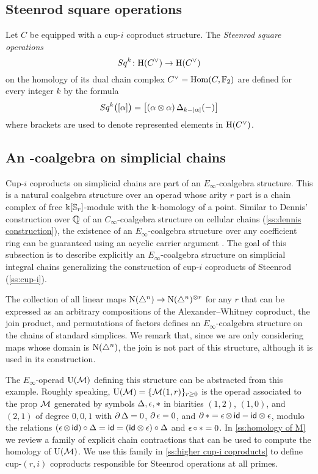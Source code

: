 \subsection{Steenrod square operations} \label{ss:steenrod squares}

Let $C$ be equipped with a cup-$i$ coproduct structure.
The \textit{Steenrod square operations}
\[
Sq^k \colon \mathrm{H}(C^\vee) \to \mathrm{H}(C^\vee)
\]
on the homology of its dual chain complex $C^\vee = \mathrm{Hom}(C, {\mathbb{F}_2})$ are defined for every integer $k$ by the formula
\begin{equation} \label{e:steenrod squares}
	Sq^k \big( [\alpha] \big) = \big[ (\alpha \otimes \alpha) \operatorname{\Delta}_{k - \lvert\alpha\rvert}(-) \big]
\end{equation}
where brackets are used to denote represented elements in $\mathrm{H}(C^\vee)$.


\subsection{An \pdfEinfty-coalgebra on simplicial chains} \label{ss:e-infty generalization}

Cup-$i$ coproducts on simplicial chains are part of an $E_\infty$-coalgebra structure.
This is a natural coalgebra structure over an operad whose arity $r$ part is a chain complex of free $\Bbbk[\mathbb{S}_r]$-module with the $\Bbbk$-homology of a point.
Similar to Dennis' construction over $\mathbb{Q}$ of an $C_\infty$-coalgebra structure on cellular chains (\cref{ss:dennis construction}), the existence of an $E_\infty$-coalgebra structure over any coefficient ring can be guaranteed using an acyclic carrier argument \cite{eilenberg1953acyclic}.
The goal of this subsection is to describe explicitly an $E_\infty$-coalgebra structure on simplicial integral chains generalizing the construction of cup-$i$ coproducts of Steenrod (\cref{ss:cup-i}).

The collection of all linear maps $\operatorname{N}(\triangle^n) \to \operatorname{N}(\triangle^n)^{\otimes r}$ for any $r$ that can be expressed as an arbitrary compositions of the Alexander--Whitney coproduct, the join product, and permutations of factors defines an $E_\infty$-coalgebra structure on the chains of standard simplices.
We remark that, since we are only considering maps whose domain is $\operatorname{N}(\triangle^n)$, the join is not part of this structure, although it is used in its construction.

The $E_\infty$-operad $\operatorname{\mathrm{U}(\mathcal{M})}$ defining this structure can be abstracted from this example.
Roughly speaking, $\operatorname{\mathrm{U}(\mathcal{M})} = \{\operatorname{\mathcal{M}}(1,r)\}_{r \geq 0}$ is the operad associated to the prop $\operatorname{\mathcal{M}}$ generated by symbols $\operatorname{\Delta}, \operatorname{\epsilon}, \operatorname{\ast}$ in biarities $(1,2)$, $(1,0)$, and $(2,1)$ of degree $0,0,1$ with $\operatorname{\partial} \operatorname{\Delta} = 0$, $\operatorname{\partial} \operatorname{\epsilon} = 0$, and $\operatorname{\partial} \operatorname{\ast} = \operatorname{\epsilon} \otimes \, \mathsf{id} - \mathsf{id} \otimes \operatorname{\epsilon}$, modulo the relations $(\operatorname{\epsilon} \otimes \, \mathsf{id}) \circ \operatorname{\Delta} = \mathsf{id} = (\mathsf{id} \otimes \operatorname{\epsilon}) \circ \operatorname{\Delta}$ and $\operatorname{\epsilon} \circ \, \ast = 0$.
In \cref{ss:homology of M} we review a family of explicit chain contractions that can be used to compute the homology of $\operatorname{\mathrm{U}(\mathcal{M})}$.
We use this family in \cref{ss:higher cup-i coproducts} to define cup-$(r,i)$ coproducts responsible for Steenrod operations at all primes.

